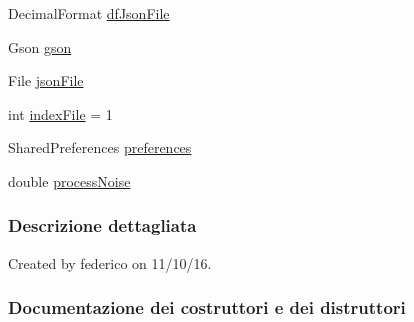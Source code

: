\begin{DoxyCompactItemize}
\item 
Decimal\+Format \hyperlink{classit_1_1unibo_1_1torsello_1_1bluetoothpositioning_1_1util_1_1ReportUtils_a29b88de66ca4b3e85b3cc86e9621c26a_a29b88de66ca4b3e85b3cc86e9621c26a}{df\+Json\+File}
\item 
Gson \hyperlink{classit_1_1unibo_1_1torsello_1_1bluetoothpositioning_1_1util_1_1ReportUtils_a974d9bac8edb83847a34b20db0299fca_a974d9bac8edb83847a34b20db0299fca}{gson}
\item 
File \hyperlink{classit_1_1unibo_1_1torsello_1_1bluetoothpositioning_1_1util_1_1ReportUtils_a3d54acab8d9785425b61d7a294444f85_a3d54acab8d9785425b61d7a294444f85}{json\+File}
\item 
int \hyperlink{classit_1_1unibo_1_1torsello_1_1bluetoothpositioning_1_1util_1_1ReportUtils_afcda83ce8a192e352a399e5454fcbba6_afcda83ce8a192e352a399e5454fcbba6}{index\+File} = 1
\item 
Shared\+Preferences \hyperlink{classit_1_1unibo_1_1torsello_1_1bluetoothpositioning_1_1util_1_1ReportUtils_af1f57227f8c42073b4f8f2b65e86ebd7_af1f57227f8c42073b4f8f2b65e86ebd7}{preferences}
\item 
double \hyperlink{classit_1_1unibo_1_1torsello_1_1bluetoothpositioning_1_1util_1_1ReportUtils_ab1f0b60e037c211df9cc6dc34ebb8030_ab1f0b60e037c211df9cc6dc34ebb8030}{process\+Noise}
\end{DoxyCompactItemize}


\subsubsection{Descrizione dettagliata}
Created by federico on 11/10/16. 

\subsubsection{Documentazione dei costruttori e dei distruttori}
\hypertarget{classit_1_1unibo_1_1torsello_1_1bluetoothpositioning_1_1util_1_1ReportUtils_af9975aaf0a16c6a51afd258b8c3f77c0_af9975aaf0a16c6a51afd258b8c3f77c0}{}\label{classit_1_1unibo_1_1torsello_1_1bluetoothpositioning_1_1util_1_1ReportUtils_af9975aaf0a16c6a51afd258b8c3f77c0_af9975aaf0a16c6a51afd258b8c3f77c0} 
